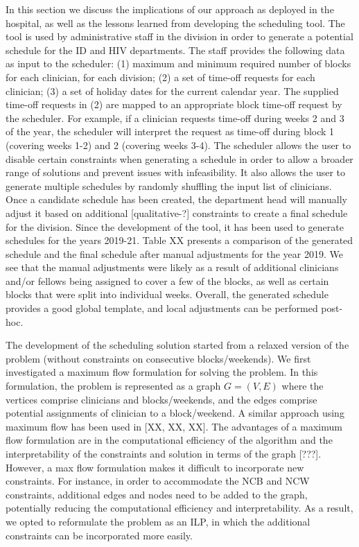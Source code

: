In this section we discuss the implications of our approach as deployed in the hospital,
as well as the lessons learned from developing the scheduling tool.
The tool is used by administrative staff in the division in order to generate a potential schedule
for the ID and HIV departments. 
The staff provides the following data as input to the scheduler:
(1) maximum and minimum required number of blocks for each clinician, for each division;
(2) a set of time-off requests for each clinician;
(3) a set of holiday dates for the current calendar year.
The supplied time-off requests in (2) are mapped to an appropriate block time-off request by the scheduler.
For example, if a clinician requests time-off during weeks 2 and 3 of the year, the scheduler
will interpret the request as time-off during block 1 (covering weeks 1-2) and 2 (covering weeks 3-4).
The scheduler allows the user to disable certain constraints when generating a schedule
in order to allow a broader range of solutions and prevent issues with infeasibility. 
It also allows the user to generate multiple schedules by randomly shuffling the input list of clinicians.
Once a candidate schedule has been created, the department head will manually adjust it based on
additional [qualitative-?] constraints to create a final schedule for the division.
Since the development of the tool, it has been used to generate schedules for the years 2019-21.
Table XX presents a comparison of the generated schedule and the final schedule after manual adjustments
for the year 2019. We see that the manual adjustments were likely as a result of additional clinicians
and/or fellows being assigned to cover a few of the blocks, as well as certain blocks that were 
split into individual weeks. Overall, the generated schedule provides a good global template,
and local adjustments can be performed post-hoc.

The development of the scheduling solution started from a relaxed version of the problem
(without constraints on consecutive blocks/weekends).
We first investigated a maximum flow formulation for solving the problem.
In this formulation, the problem is represented as a graph $G=(V, E)$ where
the vertices comprise clinicians and blocks/weekends, and the edges comprise
potential assignments of clinician to a block/weekend.
A similar approach using maximum flow has been used in [XX, XX, XX].
The advantages of a maximum flow formulation are in the computational efficiency
of the algorithm and the interpretability of the constraints and solution in terms of the graph [???].
However, a max flow formulation makes it difficult to incorporate new constraints.
For instance, in order to accommodate the NCB and NCW constraints,
additional edges and nodes need to be added to the graph, potentially reducing 
the computational efficiency and interpretability.
As a result, we opted to reformulate the problem as an ILP, in which the additional constraints
can be incorporated more easily.

